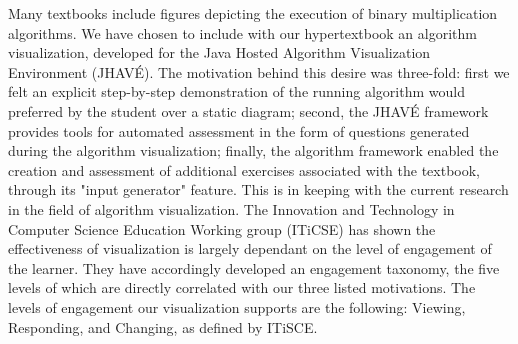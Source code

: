 \documentclass{acm_proc_article-sp}
\begin{document}
Many textbooks include figures depicting the execution of binary multiplication algorithms.  We have chosen to include with our hypertextbook an algorithm visualization, developed for the Java Hosted Algorithm Visualization Environment (JHAVÉ). The motivation behind this desire was three-fold: first we felt an explicit step-by-step demonstration of the running algorithm would preferred by the student over a static diagram; second, the JHAVÉ framework provides tools for automated assessment in the form of questions generated during the algorithm visualization; finally, the algorithm framework enabled the creation and assessment of additional exercises associated with the textbook, through its "input generator" feature.  This is in keeping with the current research in the field of algorithm visualization\cite{needsCitation}.  The Innovation and Technology in Computer Science Education Working group (ITiCSE) has shown the effectiveness of visualization is largely dependant on the level of engagement of the learner\cite{needsCitation}.  They have accordingly developed an engagement taxonomy, the five levels of which are directly correlated with our three listed motivations.  The levels of engagement our visualization supports are the following: Viewing, Responding, and Changing, as defined by ITiSCE.

\balancecolumns
\end{document}
